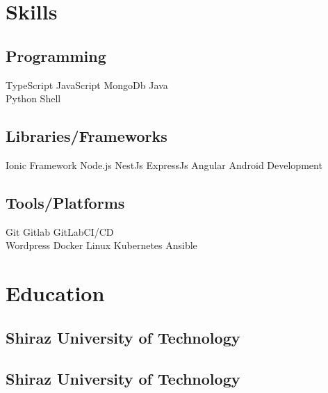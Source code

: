 \documentclass[]{plushcv}
\begin{document}
\begin{minipage}[t]{0.25\textwidth} 


\section{Skills}
\subsection{Programming}
\sectionsep
{}
 TypeScript \textbullet{} JavaScript  
  \textbullet{} MongoDb  
\sectionsep
\location
{}
Java   \\
\sectionsep
{}
 Python \textbullet{}  Shell  \\
\sectionsep
\sectionsep
\subsection{Libraries/Frameworks}
\sectionsep
Ionic Framework \textbullet{} Node.js \textbullet{} NestJs \textbullet{} ExpressJs \textbullet{} Angular \textbullet{} Android Development \\
\sectionsep
\sectionsep
\subsection{Tools/Platforms}
\sectionsep
Git \textbullet{} Gitlab \textbullet{} GitLab\-CI/CD     \\ Wordpress \textbullet{} Docker \textbullet{} Linux  \textbullet{} Kubernetes    \textbullet{} Ansible

\sectionsep


\section{Education} 
\subsection{Shiraz University of Technology}

\sectionsep
\subsection{Shiraz University of Technology}
\sectionsep
\


\end{minipage}
\end{document}
